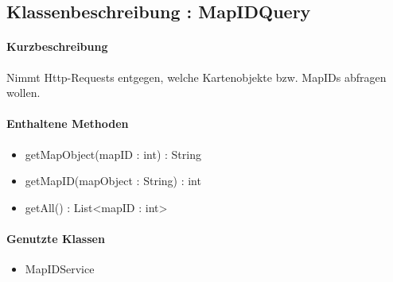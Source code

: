 \subsection{Klassenbeschreibung : MapIDQuery}%
\paragraph*{Kurzbeschreibung}
Nimmt Http-Requests entgegen, welche Kartenobjekte bzw. MapIDs abfragen wollen.
\paragraph*{Enthaltene Methoden}
\begin{itemize}
    \item getMapObject(mapID : int) : String
    \item getMapID(mapObject : String) : int
    \item getAll() : List<mapID : int>
\end{itemize}
\paragraph*{Genutzte Klassen}
\begin{itemize}
    \item MapIDService
\end{itemize}

